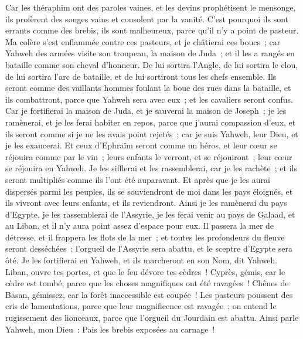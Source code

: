 \begin{multicols}{2}
Car les théraphim ont des paroles vaines, et les devins prophétisent le mensonge, ils profèrent des songes vains et consolent par la vanité. C'est pourquoi ils sont errants comme des brebis, ils sont malheureux, parce qu'il n'y a point de pasteur.
Ma colère s'est enflammée contre ces pasteurs, et je châtierai ces boucs~; car Yahweh des armées visite son troupeau, la maison de Juda~; et il les a rangés en bataille comme son cheval d'honneur.
De lui sortira l'Angle, de lui sortira le clou, de lui sortira l'arc de bataille, et de lui sortiront tous les chefs ensemble.
Ils seront comme des vaillants hommes foulant la boue des rues dans la bataille, et ils combattront, parce que Yahweh sera avec eux~; et les cavaliers seront confus.
Car je fortifierai la maison de Juda, et je sauverai la maison de Joseph~; je les ramènerai, et je les ferai habiter en repos, parce que j'aurai compassion d'eux, et ils seront comme si je ne les avais point rejetés~; car je suis Yahweh, leur Dieu, et je les exaucerai.
Et ceux d'Ephraïm seront comme un héros, et leur cœur se réjouira comme par le vin~; leurs enfants le verront, et se réjouiront~; leur cœur se réjouira en Yahweh.
Je les sifflerai et les rassemblerai, car je les rachète~; et ils seront multipliés comme ils l'ont été auparavant.
Et après que je les aurai dispersés parmi les peuples, ils se souviendront de moi dans les pays éloignés, et ils vivront avec leurs enfants, et ils reviendront.
Ainsi je les ramènerai du pays d'Egypte, je les rassemblerai de l'Assyrie, je les ferai venir au pays de Galaad, et au Liban, et il n'y aura point assez d'espace pour eux.
Il passera la mer de détresse, et il frappera les flots de la mer~; et toutes les profondeurs du fleuve seront desséchées~; l'orgueil de l'Assyrie sera abattu, et le sceptre d'Egypte sera ôté.
Je les fortifierai en Yahweh, et ils marcheront en son Nom, dit Yahweh.
\VerseOne{}Liban, ouvre tes portes, et que le feu dévore tes cèdres~!
Cyprès, gémis, car le cèdre est tombé, parce que les choses magnifiques ont été ravagées~! Chênes de Basan, gémissez, car la forêt inaccessible est coupée~!
Les pasteurs poussent des cris de lamentations, parce que leur magnificence est ravagée~; on entend le rugissement des lionceaux, parce que l'orgueil du Jourdain est abattu.
Ainsi parle Yahweh, mon Dieu~: Pais les brebis exposées au carnage~!

\end{multicols}
